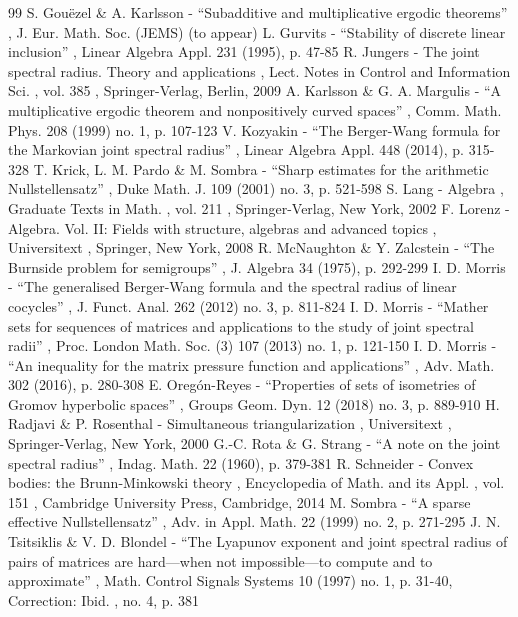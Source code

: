 \documentclass[11pt]{article}
\begin{document}
\begin{thebibliography}{99}
 S. Gouëzel \& A. Karlsson - “Subadditive and multiplicative ergodic theorems” , J. Eur. Math. Soc. (JEMS) (to appear)
 L. Gurvits - “Stability of discrete linear inclusion” , Linear Algebra Appl. 231 (1995), p. 47-85
 R. Jungers - The joint spectral radius. Theory and applications , Lect. Notes in Control and Information Sci. , vol. 385 , Springer-Verlag, Berlin, 2009
 A. Karlsson \& G. A. Margulis - “A multiplicative ergodic theorem and nonpositively curved spaces” , Comm. Math. Phys. 208 (1999) no. 1, p. 107-123
 V. Kozyakin - “The Berger-Wang formula for the Markovian joint spectral radius” , Linear Algebra Appl. 448 (2014), p. 315-328
 T. Krick, L. M. Pardo \& M. Sombra - “Sharp estimates for the arithmetic Nullstellensatz” , Duke Math. J. 109 (2001) no. 3, p. 521-598
 S. Lang - Algebra , Graduate Texts in Math. , vol. 211 , Springer-Verlag, New York, 2002
 F. Lorenz - Algebra. Vol. II: Fields with structure, algebras and advanced topics , Universitext , Springer, New York, 2008
 R. McNaughton \& Y. Zalcstein - “The Burnside problem for semigroups” , J. Algebra 34 (1975), p. 292-299
 I. D. Morris - “The generalised Berger-Wang formula and the spectral radius of linear cocycles” , J. Funct. Anal. 262 (2012) no. 3, p. 811-824
 I. D. Morris - “Mather sets for sequences of matrices and applications to the study of joint spectral radii” , Proc. London Math. Soc. (3) 107 (2013) no. 1, p. 121-150
 I. D. Morris - “An inequality for the matrix pressure function and applications” , Adv. Math. 302 (2016), p. 280-308
 E. Oregón-Reyes - “Properties of sets of isometries of Gromov hyperbolic spaces” , Groups Geom. Dyn. 12 (2018) no. 3, p. 889-910
 H. Radjavi \& P. Rosenthal - Simultaneous triangularization , Universitext , Springer-Verlag, New York, 2000
 G.-C. Rota \& G. Strang - “A note on the joint spectral radius” , Indag. Math. 22 (1960), p. 379-381
 R. Schneider - Convex bodies: the Brunn-Minkowski theory , Encyclopedia of Math. and its Appl. , vol. 151 , Cambridge University Press, Cambridge, 2014
 M. Sombra - “A sparse effective Nullstellensatz” , Adv. in Appl. Math. 22 (1999) no. 2, p. 271-295
 J. N. Tsitsiklis \& V. D. Blondel - “The Lyapunov exponent and joint spectral radius of pairs of matrices are hard—when not impossible—to compute and to approximate” , Math. Control Signals Systems 10 (1997) no. 1, p. 31-40, Correction: Ibid. , no. 4, p. 381
\end{thebibliography}
\end{document}
